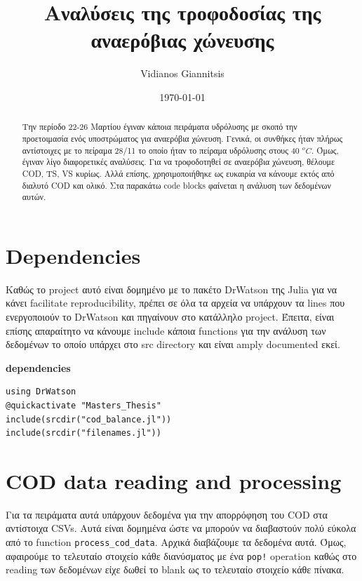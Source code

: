 \documentclass[11pt]{article}
\author{Vidianos Giannitsis}
\date{\today}
\title{Αναλύσεις της τροφοδοσίας της αναερόβιας χώνευσης}
\begin{document}
\maketitle
\tableofcontents

\begin{abstract}
Την περίοδο 22-26 Μαρτίου έγιναν κάποια πειράματα υδρόλυσης με σκοπό την προετοιμασία ενός υποστρώματος για αναερόβια χώνευση. Γενικά, οι συνθήκες ήταν πλήρως αντίστοιχες με το πείραμα 28/11 το οποίο ήταν το πείραμα υδρόλυσης στους 40 \( ^oC \). Όμως, έγιναν λίγο διαφορετικές αναλύσεις. Για να τροφοδοτηθεί σε αναερόβια χώνευση, θέλουμε COD, TS, VS κυρίως. Αλλά επίσης, χρησιμοποιήθηκε ως ευκαιρία να κάνουμε εκτός από διαλυτό COD και ολικό. Στα παρακάτω code blocks φαίνεται η ανάλυση των δεδομένων αυτών.
\end{abstract}

\section{Dependencies}
\label{sec:orge51304b}
Καθώς το project αυτό είναι δομημένο με το πακέτο DrWatson της Julia για να κάνει facilitate reproducibility, πρέπει σε όλα τα αρχεία να υπάρχουν τα lines που ενεργοποιούν το DrWatson και πηγαίνουν στο κατάλληλο project. Έπειτα, είναι επίσης απαραίτητο να κάνουμε include κάποια functions για την ανάλυση των δεδομένων το οποίο υπάρχει στο src directory και είναι amply documented εκεί.

\textbf{dependencies}
\begin{verbatim}
using DrWatson
@quickactivate "Masters_Thesis"
include(srcdir("cod_balance.jl"))
include(srcdir("filenames.jl"))
\end{verbatim}

\section{COD data reading and processing}
\label{sec:orgcffb9f0}
Για τα πειράματα αυτά υπάρχουν δεδομένα για την απορρόφηση του COD στα αντίστοιχα CSVs. Αυτά είναι δομημένα ώστε να μπορούν να διαβαστούν πολύ εύκολα από το function \texttt{process\_cod\_data}. Αρχικά διαβάζουμε τα δεδομένα αυτά. Όμως, αφαιρούμε το τελευταίο στοιχείο κάθε διανύσματος με ένα \texttt{pop!} operation καθώς στο reading των δεδομένων είχε δωθεί το blank ως το τελευταίο στοιχείο κάθε πίνακα.
\end{document}
